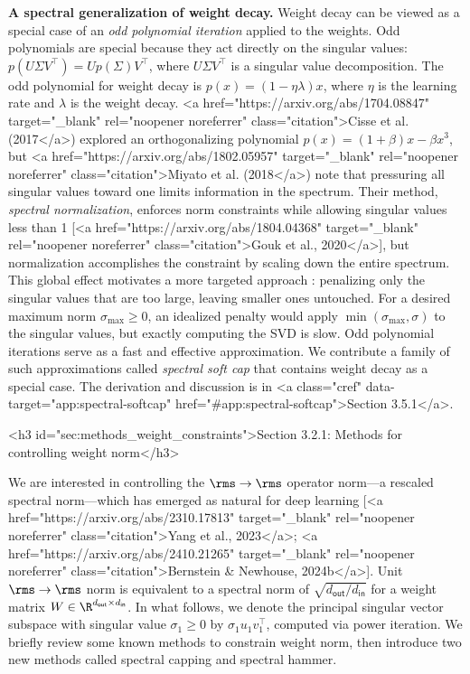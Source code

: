 \textbf{A spectral generalization of weight decay.} Weight decay can be viewed as a special case of an \textit{odd polynomial iteration} applied to the weights. Odd polynomials are special because they act directly on the singular values: $p(U \Sigma V^\top) = U p(\Sigma) V^\top$, where $U\Sigma V^\top$ is a singular value decomposition. The odd polynomial for weight decay is $p(x) = (1 - \eta \lambda) x$, where $\eta$ is the learning rate and $\lambda$ is the weight decay. <a href="https://arxiv.org/abs/1704.08847" target="_blank" rel="noopener noreferrer" class="citation">Cisse et al. (2017</a>) explored an orthogonalizing polynomial $p(x) = (1 + \beta)x - \beta x^3$, but <a href="https://arxiv.org/abs/1802.05957" target="_blank" rel="noopener noreferrer" class="citation">Miyato et al. (2018</a>) note that pressuring all singular values toward one limits information in the spectrum. Their method, \textit{spectral normalization}, enforces norm constraints while allowing singular values less than 1 [<a href="https://arxiv.org/abs/1804.04368" target="_blank" rel="noopener noreferrer" class="citation">Gouk et al., 2020</a>], but normalization accomplishes the constraint by scaling down the entire spectrum. This global effect motivates a more targeted approach
: penalizing only the singular values that are too large, leaving smaller ones untouched. For a desired maximum norm $\sigma_\text{max} \geq 0$, an idealized penalty would apply $\min(\sigma_\text{max}, \sigma)$ to the singular values, but exactly computing the SVD is slow. Odd polynomial iterations serve as a fast and effective approximation. We contribute a family of such approximations called \textit{spectral soft cap} that contains weight decay as a special case. The derivation and discussion is in <a class="cref" data-target="app:spectral-softcap" href="#app:spectral-softcap">Section 3.5.1</a>.

<h3 id="sec:methods_weight_constraints">Section 3.2.1: Methods for controlling weight norm</h3>

We are interested in controlling the $\rms \to \rms$ operator norm---a rescaled spectral norm---which has emerged as natural for deep learning [<a href="https://arxiv.org/abs/2310.17813" target="_blank" rel="noopener noreferrer" class="citation">Yang et al., 2023</a>; <a href="https://arxiv.org/abs/2410.21265" target="_blank" rel="noopener noreferrer" class="citation">Bernstein & Newhouse, 2024b</a>]. Unit $\rms\to\rms$ norm is equivalent to a spectral norm of $\sqrt{d_\mathsf{out}/d_\mathsf{in}}$ for a weight matrix $W \in \R^{d_\mathsf{out} \times d_\mathsf{in}}$. In what follows, we denote the principal singular vector subspace with singular value $\sigma_1 \geq 0$ by $\sigma_1 u_1 v_1^\top$, computed via power iteration. We briefly review some known methods to constrain weight norm, then introduce two new methods called spectral capping and spectral hammer.

